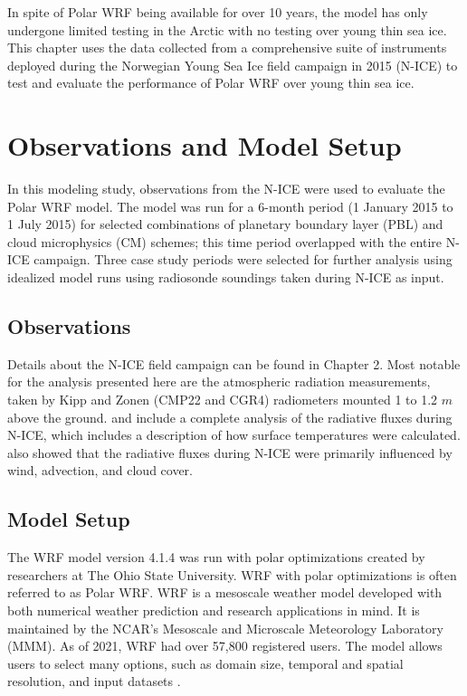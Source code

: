 In spite of Polar WRF being available for over 10 years, the model has only undergone limited testing in the Arctic with no testing over young thin sea ice. This chapter uses the data collected from a comprehensive suite of instruments deployed during the Norwegian Young Sea Ice field campaign in 2015 (N-ICE) to test and evaluate the performance of Polar WRF over young thin sea ice. 

\section{Observations and Model Setup}
In this modeling study, observations from the N-ICE were used to evaluate the Polar WRF model. The model was run for a 6-month period (1 January 2015 to 1 July 2015) for selected combinations of planetary boundary layer (PBL) and cloud microphysics (CM) schemes; this time period overlapped with the entire N-ICE campaign. Three case study periods were selected for further analysis using idealized model runs using radiosonde soundings taken during N-ICE as input.

\subsection{Observations}
Details about the N-ICE field campaign can be found in Chapter 2. Most notable for the analysis presented here are the atmospheric radiation measurements, taken by Kipp and Zonen (CMP22 and CGR4) radiometers mounted 1 to 1.2 $m$ above the ground. \citet{granskog:2015} and \citet{walden:2017} include a complete analysis of the radiative fluxes during N-ICE, which includes a description of how surface temperatures were calculated. \citet{walden:2017} also showed that the radiative fluxes during N-ICE were primarily influenced by wind, advection, and cloud cover. 

\subsection{Model Setup}
The WRF model version 4.1.4 was run with polar optimizations created by researchers at The Ohio State University. WRF with polar optimizations is often referred to as Polar WRF. WRF is a mesoscale weather model developed with both numerical weather prediction and research applications in mind. It is maintained by the NCAR's Mesoscale and Microscale Meteorology Laboratory (MMM). As of 2021, WRF had over 57,800 registered users. The model allows users to select many options, such as domain size, temporal and spatial resolution, and input datasets \citep{skamarock:2019}.

